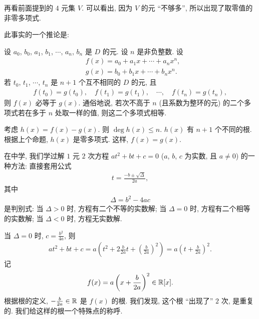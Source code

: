 \begin{remark}
    再看前面提到的 $4$ 元集 $V$. 可以看出, 因为 $V$ 的元 ``不够多'', 所以出现了取零值的非零多项式.
\end{remark}

此事实的一个推论是:

\begin{proposition}
    设 $a_0$, $b_0$, $a_1$, $b_1$, $\cdots$, $a_n$, $b_n$ 是 $D$ 的元. 设 $n$ 是非负整数. 设
    \begin{align*}
         & f(x) = a_0 + a_1 x + \cdots + a_n x^n, \\
         & g(x) = b_0 + b_1 x + \cdots + b_n x^n.
    \end{align*}
    若 $t_0$, $t_1$, $\cdots$, $t_n$ 是 $n+1$ 个互不相同的 $D$ 的元, 且
    \begin{align*}
        f(t_0) = g(t_0), \quad f(t_1) = g(t_1), \quad \cdots, \quad f(t_n) = g(t_n),
    \end{align*}
    则 $f(x)$ 必等于 $g(x)$. 通俗地说, 若次不高于 $n$ (且系数为整环的元) 的二个多项式若在多于 $n$ 处取一样的值, 则这二个多项式相等.
\end{proposition}

\begin{pf}
    考虑 $h(x) = f(x) - g(x)$. 则 $\deg h(x) \leq n$. $h(x)$ 有 $n+1$ 个不同的根. 根据上个命题, $h(x)$ 是零多项式. 这样, $f(x) = g(x)$.
\end{pf}

在中学, 我们学过解 $1$ 元 $2$ 次方程 $at^2 + bt + c = 0$ ($a$, $b$, $c$ 为实数, 且 $a \neq 0$) 的一种方法: 直接套用公式
\begin{align*}
    t = \frac{-b \pm \sqrt{\Delta}}{2a},
\end{align*}
其中
\begin{align*}
    \Delta = b^2 - 4ac
\end{align*}
是判别式: 当 $\Delta > 0$ 时, 方程有二个不等的实数解; 当 $\Delta = 0$ 时, 方程有二个相等的实数解; 当 $\Delta < 0$ 时, 方程无实数解.

当 $\Delta = 0$ 时, $c = \frac{b^2}{4a}$, 则
\begin{align*}
    at^2 + bt + c = a \left( t^2 + 2\frac{b}{2a}t + \left(\frac{b}{2a}\right)^2 \right) = a \left( t + \frac{b}{2a} \right)^2.
\end{align*}
记
$$
    f(x) = a \left( x + \frac{b}{2a} \right)^2 \in \mathbb{R}[x].
$$
根据根的定义, $-\frac{b}{2a} \in \mathbb{R}$ 是 $f(x)$ 的根. 我们发现, 这个根 ``出现了'' $2$ 次, 是重复的. 我们给这样的根一个特殊点的称呼.

